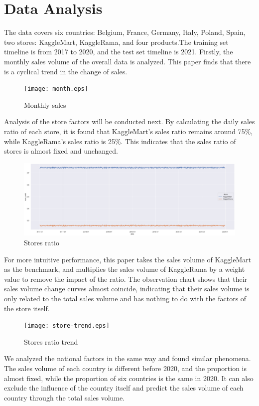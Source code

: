 \section{Data Analysis} \label{sec-preliminaries}
The data covers six countries: Belgium, France, Germany, Italy, Poland, Spain, two stores: KaggleMart, KaggleRama, and four products.The training set timeline is from 2017 to 2020, and the test set timeline is 2021.
Firstly, the monthly sales volume of the overall data is analyzed. This paper finds that there is a cyclical trend in the change of sales.

\begin{figure}[!h]
		\centering
		\texttt{[image: month.eps]}
		\caption{Monthly sales}\label{fig:OutAspect-target}
\end{figure}
Analysis of the store factors will be conducted next. By calculating the daily sales ratio of each store, it is found that KaggleMart's sales ratio remains around 75\%, while KaggleRama's sales ratio is 25\%. This indicates that the sales ratio of stores is almost fixed and unchanged.



\begin{figure}[H]
	\centering
	\includegraphics[scale=0.21]{store-ratio.eps}
	\caption{Stores ratio}\label{fig:OutAspect-target}
\end{figure}

For more intuitive performance, this paper takes the sales volume of KaggleMart as the benchmark, and multiplies the sales volume of KaggleRama by a weight value to remove the impact of the ratio. The observation chart shows that their sales volume change curves almost coincide, indicating that their sales volume is only related to the total sales volume and has nothing to do with the factors of the store itself.

\begin{figure}[htb]
	\centering
	\texttt{[image: store-trend.eps]}
	\caption{Stores ratio trend}\label{fig:OutAspect-target}
\end{figure}
We analyzed the national factors in the same way and found similar phenomena. The sales volume of each country is different before 2020, and the proportion is almost fixed, while the proportion of six countries is the same in 2020. It can also exclude the influence of the country itself and predict the sales volume of each country through the total sales volume.

